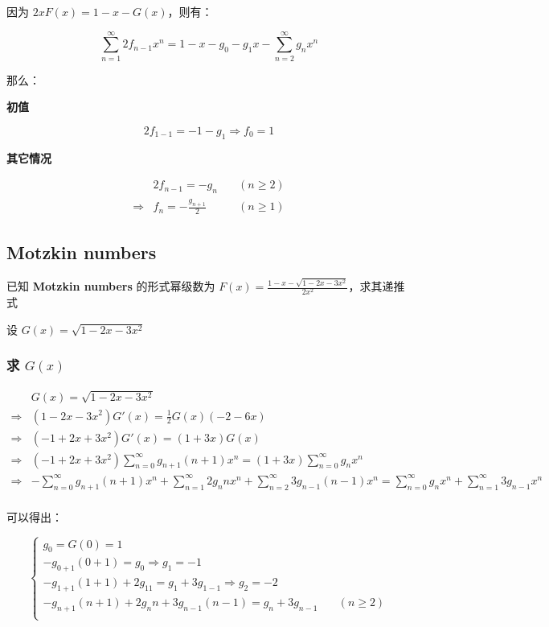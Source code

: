 \documentclass[UTF8]{article}
\begin{document}
因为 $2xF(x)=1-x-G(x)$，则有：

$$
\sum_{n=1}^{\infty}2f_{n-1}x^n=1-x-g_0-g_1x-\sum_{n=2}^{\infty}g_nx^n
$$

那么：

\textbf{初值}

$$
2f_{1-1}=-1-g_1 \Rightarrow f_0=1
$$

\textbf{其它情况}

$$
\begin{aligned}
&2f_{n-1}=-g_n \quad &(n \ge 2) \\
\Rightarrow &f_{n}=-\frac{g_{n+1}}{2} \quad & (n \ge 1)
\end{aligned}
$$

\subsection{Motzkin numbers}

已知 \textbf{Motzkin numbers} 的形式幂级数为 $F(x)=\frac{1-x-\sqrt{1-2x-3x^2}}{2x^2}$，求其递推式

设 $G(x)=\sqrt{1-2x-3x^2}$

\subsubsection{求 $G(x)$}

$$
\begin{aligned}
&G(x)=\sqrt{1-2x-3x^2} \\
\Rightarrow &(1-2x-3x^2)G'(x)=\frac{1}{2}G(x)(-2-6x) \\
\Rightarrow &(-1+2x+3x^2)G'(x)=(1+3x)G(x) \\
\Rightarrow &(-1+2x+3x^2)\sum_{n=0}^{\infty}g_{n+1}(n+1)x^n=(1+3x)\sum_{n=0}^{\infty}g_nx^n \\
\Rightarrow &-\sum_{n=0}^{\infty}g_{n+1}(n+1)x^n+\sum_{n=1}^{\infty}2g_{n}nx^n+\sum_{n=2}^{\infty}3g_{n-1}(n-1)x^n=\sum_{n=0}^{\infty}g_nx^n+\sum_{n=1}^{\infty}3g_{n-1}x^n \\
\end{aligned}
$$

可以得出：

$$
\begin{cases}
g_0=G(0)=1 \\
-g_{0+1}(0+1)=g_0 \Rightarrow g_1=-1 \\
-g_{1+1}(1+1)+2g_11=g_1+3g_{1-1} \Rightarrow g_2=-2 \\
-g_{n+1}(n+1)+2g_nn+3g_{n-1}(n-1)=g_{n}+3g_{n-1} \quad & (n \ge 2)\\
\end{cases}
$$
\end{document}
